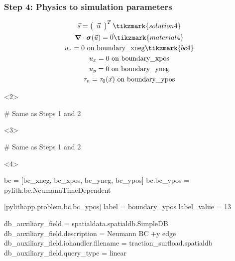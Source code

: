 \documentclass[aspectratio=169]{beamer}
\begin{document}
\begin{frame}[t,fragile]
  \frametitle{Step 4: Physics to simulation parameters}
  \summary{}

  \begin{minipage}[t]{0.3\textwidth}
    {\scriptsize
    \begin{gather*}
        \vec{s} = \left(\begin{array}{c} \vec{u} \end{array}\right)^T \tikzmark{solution4}\\
        \tensor{\nabla} \cdot \tensor{\sigma}(\vec{u}) = \vec{0} \tikzmark{material4}\\
        u_x = 0 \text{ on boundary\_xneg} \tikzmark{bc4}\\
        u_x = 0 \text{ on boundary\_xpos} \\
        u_y = 0 \text{ on boundary\_yneg} \\
        \tau_n = \tau_0(\vec{x}) \text{ on boundary\_ypos}
    \end{gather*}}
  \end{minipage}
  \hfill
  \begin{minipage}[t]{0.67\textwidth}
    \begin{onlyenv}<2>
      \begin{cfgcode}
        # Same as Steps 1 and 2
      \end{cfgcode}
    \end{onlyenv}
    \begin{onlyenv}<3>
      \begin{cfgcode}
        # Same as Steps 1 and 2
      \end{cfgcode}
    \end{onlyenv}
    \begin{onlyenv}<4>
      \begin{cfgcode}
        bc = [bc_xneg, bc_xpos, bc_yneg, bc_ypos]
        bc.bc_ypos = pylith.bc.NeumannTimeDependent

        [pylithapp.problem.bc.bc_ypos]
        label = boundary_ypos
        label_value = 13

        db_auxiliary_field = spatialdata.spatialdb.SimpleDB
        db_auxiliary_field.description = Neumann BC +y edge
        db_auxiliary_field.iohandler.filename = traction_surfload.spatialdb
        db_auxiliary_field.query_type = linear


\end{cfgcode}
\end{onlyenv}
\end{minipage}
\end{frame}
\end{document}

